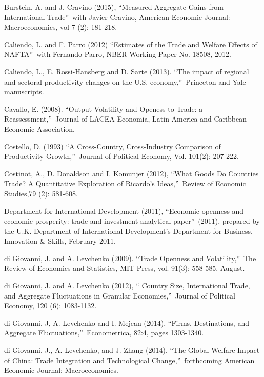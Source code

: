 \documentclass[12pt]{article}
\begin{document}
\begin{thebibliography}{99}
\bibitem{} Burstein, A. and J. Cravino (2015), \textquotedblleft Measured
Aggregate Gains from International Trade\textquotedblright\ with Javier
Cravino, American Economic Journal: Macroeconomics, vol 7 (2): 181-218.

\bibitem{} Caliendo, L. and F. Parro (2012) \textquotedblleft Estimates of
the Trade and Welfare Effects of NAFTA\textquotedblright\ with Fernando
Parro, NBER Working Paper No. 18508, 2012.

\bibitem{} Caliendo, L., E. Rossi-Hansberg and D. Sarte (2013).
\textquotedblleft The impact of regional and sectoral productivity changes
on the U.S. economy,\textquotedblright\ Princeton and Yale manuscripts.

\bibitem{} Cavallo, E. (2008). \textquotedblleft Output Volatility and
Openess to Trade: a Reassessment,\textquotedblright\ Journal of LACEA
Economia, Latin America and Caribbean Economic Association.

\bibitem{} Costello, D. (1993) \textquotedblleft A Cross-Country,
Cross-Industry Comparison of Productivity Growth,\textquotedblright\ Journal
of Political Economy, Vol. 101(2): 207-222.

\bibitem{} Costinot, A., D. Donaldson and I. Komunjer (2012),
\textquotedblleft What Goods Do Countries Trade? A Quantitative Exploration
of Ricardo's Ideas,\textquotedblright\ Review of Economic Studies,79 (2):
581-608.

\bibitem{} Department for International Development (2011),
\textquotedblleft Economic openness and economic prosperity: trade and
investment analytical paper\textquotedblright\ (2011), prepared by the U.K.
Department of International Development's Department for Business,
Innovation \& Skills, February 2011.

\bibitem{} di Giovanni, J. and A. Levchenko (2009). \textquotedblleft Trade
Openness and Volatility,\textquotedblright\ The Review of Economics and
Statistics, MIT Press, vol. 91(3): 558-585, August.

\bibitem{} di Giovanni, J. and A. Levchenko (2012), \textquotedblleft
Country Size, International Trade, and Aggregate Fluctuations in Granular
Economies,\textquotedblright\ Journal of Political Economy, 120 (6):
1083-1132.

\bibitem{} di Giovanni, J, A. Levchenko and I. Mejean (2014),
\textquotedblleft Firms, Destinations, and Aggregate
Fluctuations,\textquotedblright\ Econometrica, 82:4, pages 1303-1340.

\bibitem{} di Giovanni, J., A. Levchenko, and J. Zhang (2014).
\textquotedblleft The Global Welfare Impact of China: Trade Integration and
Technological Change,\textquotedblright\ forthcoming American Economic
Journal: Macroeconomics.


\end{thebibliography}
\end{document}
